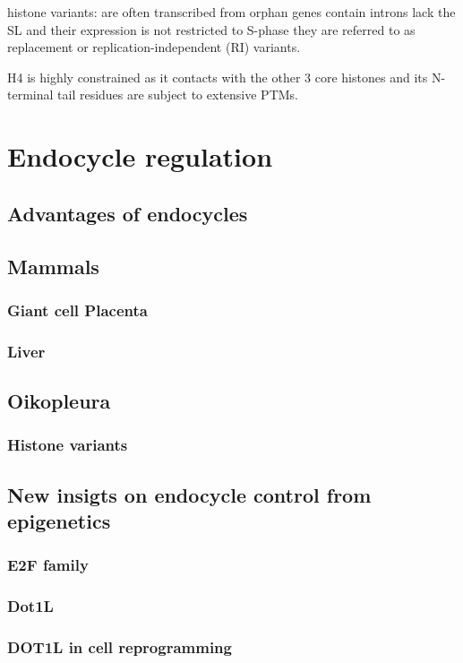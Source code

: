 \documentclass[11pt,twoside,a4paper]{report}
\begin{document}
histone variants:
	are often transcribed from orphan genes
	contain introns
	lack the SL and their expression is not restricted to S-phase
	they are referred to as replacement or replication-independent (RI) variants.

H4 is highly constrained as it contacts with the other 3 core histones and its N-terminal tail residues are subject to extensive PTMs.
		

	\section{Endocycle regulation}
		\subsection{Advantages of endocycles}
		\subsection{Mammals}
		\subsubsection{Giant cell Placenta}
		\subsubsection{Liver}
		\subsection{Oikopleura}
		\subsubsection{Histone variants}

		\subsection{New insigts on endocycle control from epigenetics}
			\subsubsection{E2F family}
			\subsubsection{Dot1L}
			\subsubsection{DOT1L in cell reprogramming}
\end{document}
